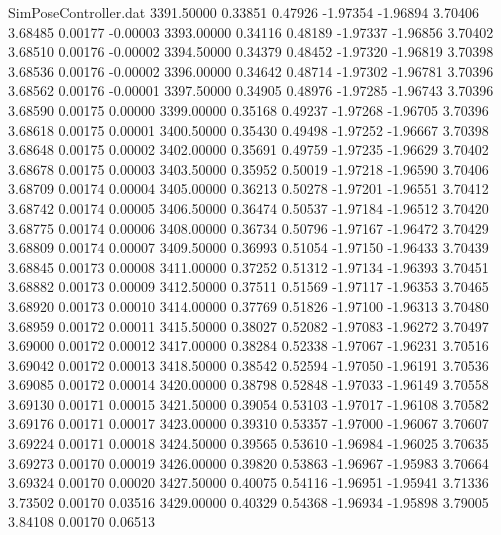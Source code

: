 \begin{filecontents}{SimPoseController.dat}
3391.50000    0.33851    0.47926    -1.97354   -1.96894    3.70406    3.68485    0.00177   -0.00003
3393.00000    0.34116    0.48189    -1.97337   -1.96856    3.70402    3.68510    0.00176   -0.00002
3394.50000    0.34379    0.48452    -1.97320   -1.96819    3.70398    3.68536    0.00176   -0.00002
3396.00000    0.34642    0.48714    -1.97302   -1.96781    3.70396    3.68562    0.00176   -0.00001
3397.50000    0.34905    0.48976    -1.97285   -1.96743    3.70396    3.68590    0.00175    0.00000
3399.00000    0.35168    0.49237    -1.97268   -1.96705    3.70396    3.68618    0.00175    0.00001
3400.50000    0.35430    0.49498    -1.97252   -1.96667    3.70398    3.68648    0.00175    0.00002
3402.00000    0.35691    0.49759    -1.97235   -1.96629    3.70402    3.68678    0.00175    0.00003
3403.50000    0.35952    0.50019    -1.97218   -1.96590    3.70406    3.68709    0.00174    0.00004
3405.00000    0.36213    0.50278    -1.97201   -1.96551    3.70412    3.68742    0.00174    0.00005
3406.50000    0.36474    0.50537    -1.97184   -1.96512    3.70420    3.68775    0.00174    0.00006
3408.00000    0.36734    0.50796    -1.97167   -1.96472    3.70429    3.68809    0.00174    0.00007
3409.50000    0.36993    0.51054    -1.97150   -1.96433    3.70439    3.68845    0.00173    0.00008
3411.00000    0.37252    0.51312    -1.97134   -1.96393    3.70451    3.68882    0.00173    0.00009
3412.50000    0.37511    0.51569    -1.97117   -1.96353    3.70465    3.68920    0.00173    0.00010
3414.00000    0.37769    0.51826    -1.97100   -1.96313    3.70480    3.68959    0.00172    0.00011
3415.50000    0.38027    0.52082    -1.97083   -1.96272    3.70497    3.69000    0.00172    0.00012
3417.00000    0.38284    0.52338    -1.97067   -1.96231    3.70516    3.69042    0.00172    0.00013
3418.50000    0.38542    0.52594    -1.97050   -1.96191    3.70536    3.69085    0.00172    0.00014
3420.00000    0.38798    0.52848    -1.97033   -1.96149    3.70558    3.69130    0.00171    0.00015
3421.50000    0.39054    0.53103    -1.97017   -1.96108    3.70582    3.69176    0.00171    0.00017
3423.00000    0.39310    0.53357    -1.97000   -1.96067    3.70607    3.69224    0.00171    0.00018
3424.50000    0.39565    0.53610    -1.96984   -1.96025    3.70635    3.69273    0.00170    0.00019
3426.00000    0.39820    0.53863    -1.96967   -1.95983    3.70664    3.69324    0.00170    0.00020
3427.50000    0.40075    0.54116    -1.96951   -1.95941    3.71336    3.73502    0.00170    0.03516
3429.00000    0.40329    0.54368    -1.96934   -1.95898    3.79005    3.84108    0.00170    0.06513

\end{filecontents}
